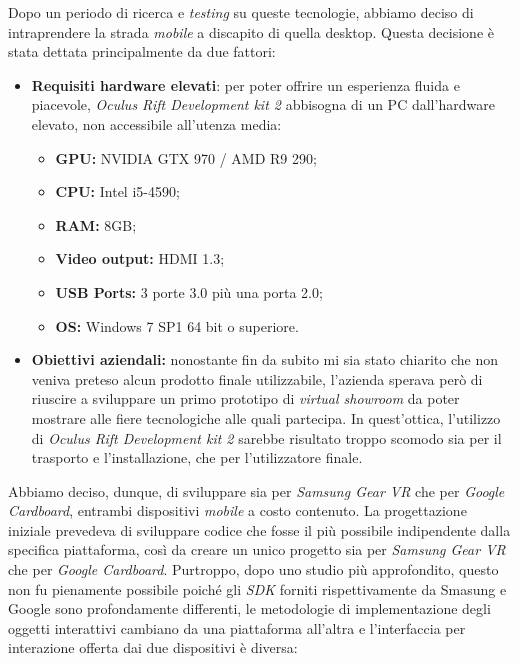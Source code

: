 Dopo un periodo di ricerca e \textit{testing} su queste tecnologie, abbiamo deciso di intraprendere la strada \textit{mobile} a discapito di quella desktop. Questa decisione è stata dettata principalmente da due fattori:

\begin{itemize}
	\item \textbf{Requisiti hardware elevati}: per poter offrire un esperienza fluida e piacevole, \textit{Oculus Rift Development kit 2} abbisogna di un PC dall'hardware elevato, non accessibile all'utenza media:
	\begin{itemize}
		\item \textbf{GPU:} NVIDIA GTX 970 / AMD R9 290;
		\item \textbf{CPU:} Intel i5-4590;
		\item \textbf{RAM:} 8GB;
		\item \textbf{Video output:} HDMI 1.3;
		\item \textbf{USB Ports:} 3 porte 3.0 più una porta 2.0;
		\item \textbf{OS:} Windows 7 SP1 64 bit o superiore.
	\end{itemize}
	
	\item \textbf{Obiettivi aziendali:} nonostante fin da subito mi sia stato chiarito che non veniva preteso alcun prodotto finale utilizzabile, l'azienda sperava però di riuscire a sviluppare un primo prototipo di \textit{virtual showroom} da poter mostrare alle fiere tecnologiche alle quali partecipa. In quest'ottica, l'utilizzo di \textit{Oculus Rift Development kit 2} sarebbe risultato troppo scomodo sia per il trasporto e l'installazione, che per l'utilizzatore finale.
\end{itemize}

Abbiamo deciso, dunque, di sviluppare sia per \textit{Samsung Gear VR} che per \textit{Google Cardboard}, entrambi dispositivi \textit{mobile} a costo contenuto. La progettazione iniziale prevedeva di sviluppare codice che fosse il più possibile indipendente dalla specifica piattaforma, così da creare un unico progetto sia per \textit{Samsung Gear VR} che per \textit{Google Cardboard}. Purtroppo, dopo uno studio più approfondito, questo non fu pienamente possibile poiché gli \textit{SDK} forniti rispettivamente da Smasung e Google sono profondamente differenti, le metodologie di implementazione degli oggetti interattivi cambiano da una piattaforma all'altra e l'interfaccia per interazione offerta dai due dispositivi è diversa: 

